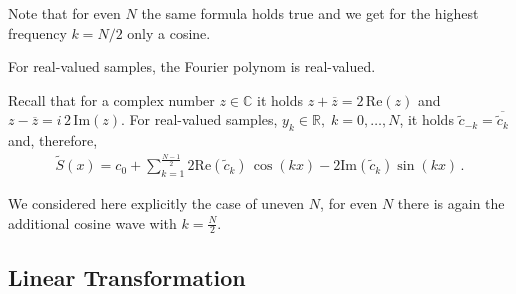 \documentclass[a4paper, 10pt]{article}
\begin{document}
{Note that for even $N$ the same formula holds true and we get for the highest frequency $k=N/2$ only a cosine.

\vspace{0.5cm}

 For real-valued samples, the Fourier polynom is real-valued.

Recall that for a complex number $z\in \mathbb C$ it holds $z+\overline z = 2\,\mathrm{Re}(z)$ and $z-\overline z = i\,2\,\mathrm{Im}(z)$. For real-valued samples, $y_k\in \mathbb R, \; k=0,\dots,N$, it holds $\tilde c_{-k} = \overline {\tilde c_k}$ and, therefore,
\begin{eqnarray*}
\tilde S(x) = c_0 +  \sum\limits_{k=1}^{\frac{N-1}{2}} 2\mathrm{Re}(\tilde c_{k}) \,\cos(kx) - 2\mathrm{Im}(\tilde c_{k}) \sin(kx)\,.
\end{eqnarray*}

We considered here explicitly the case of uneven $N$, for even $N$ there is again the additional cosine wave with $k= \frac N2$.


\subsection{Linear Transformation}


}
\end{document}
